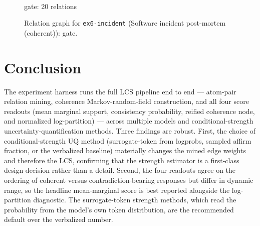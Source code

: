\documentclass[11pt]{article}
\begin{document}
\begin{figure}[htbp]
\begin{minipage}[t]{0.48\linewidth}
{
}
\\[2pt]{\footnotesize gate: 20 relations}
\end{minipage}
\caption{Relation graph for \texttt{ex6-incident} (Software incident post-mortem (coherent)): gate.}
\label{fig:graph-example-6-incident}
\end{figure}

\section{Conclusion}

The experiment harness runs the full LCS pipeline end to end --- atom-pair
relation mining, coherence Markov-random-field construction, and all four score
readouts (mean marginal support, consistency probability, reified coherence node,
and normalized log-partition) --- across multiple models and conditional-strength
uncertainty-quantification methods. Three findings are robust. First, the choice
of conditional-strength UQ method (surrogate-token from logprobs, sampled affirm
fraction, or the verbalized baseline) materially changes the mined edge weights
and therefore the LCS, confirming that the strength estimator is a first-class
design decision rather than a detail. Second, the four readouts agree on the
ordering of coherent versus contradiction-bearing responses but differ in dynamic
range, so the headline mean-marginal score is best reported alongside the
log-partition diagnostic. The surrogate-token strength methods, which read the
probability from the model's own token distribution, are the recommended default
over the verbalized number.
\end{document}
